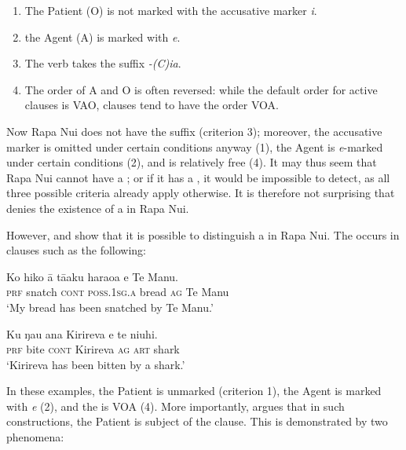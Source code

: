 \begin{enumerate}
\item 
The Patient (O) is not marked with the accusative marker \textit{i}.

\item 
the Agent (A) is marked with \textit{e}.

\item 
The verb takes the  suffix \textit{-(C)ia}.

\item 
The order of A and O is often reversed: while the default order for active clauses is VAO,  clauses tend to have the order VOA.

\end{enumerate}

Now Rapa Nui does not have the  suffix (criterion 3); moreover, the accusative marker is omitted under certain conditions anyway (1), the Agent is \textit{e}-marked under certain conditions (2), and  is relatively free (4). It may thus seem that Rapa Nui cannot have a ; or if it has a , it would be impossible to detect, as all three possible criteria already apply otherwise. It is therefore not surprising that \citet[167]{Chapin1978} denies the existence of a  in Rapa Nui.

However, \citet{Alexander1981OL} and \citet{WeberN2003} show that it is possible to distinguish a  in Rapa Nui. The  occurs in clauses such as the following:

\ea\label{ex:8.46}
\gll Ko hiko {\ꞌ}ā tā{\ꞌ}aku haraoa e Te Manu.\\
\textsc{prf} snatch \textsc{cont} \textsc{poss.1sg.a} bread \textsc{ag} Te Manu\\

\glt 
‘My bread has been snatched by Te Manu.’ \textstyleExampleref{[R245.039]} 
\z

\ea\label{ex:8.47}
\gll Ku ŋau {\ꞌ}ana Kirireva e te niuhi.\\
\textsc{prf} bite \textsc{cont} Kirireva \textsc{ag} \textsc{art} shark\\

\glt
‘Kirireva has been bitten by a shark.’ \textstyleExampleref{[R361.065]} 
\z

In these examples, the Patient is unmarked (criterion 1), the Agent is marked with \textit{e} (2), and the  is VOA (4). More importantly, \citet[56–58]{WeberN2003} argues that in such constructions, the Patient is subject of the clause. This is demonstrated by two phenomena:

